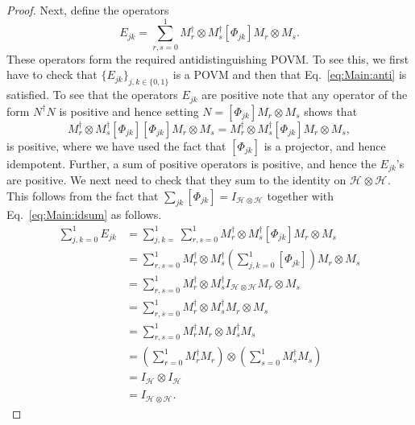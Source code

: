 \documentclass[DIV=calc,paper=a4,fontsize=11pt,twocolumn]{scrartcl} %
\theoremstyle{definition}
\theoremstyle{plain}
\newcommand{\Proj}[1]{\ensuremath{\left [ #1 \right ]}}
\newcommand{\Hilb}[1][]{\ensuremath{\mathcal{H}_{#1}}}
\begin{document}
\begin{proof}
Next, define the operators
\begin{equation}
E_{jk} = \sum_{r,s = 0}^1 M_r^{\dagger} \otimes M_s^{\dagger}
\Proj{\Phi_{jk}} M_r \otimes M_s.
\end{equation}
These operators form the required antidistinguishing POVM\@.  To see
this, we first have to check that $\{E_{jk}\}_{j,k \in \{0,1\}}$ is
a POVM and then that Eq.~\eqref{eq:Main:anti} is satisfied.  To see
that the operators $E_{jk}$ are positive note that any operator of
the form $N^{\dagger}N$ is positive and hence setting $N =
\Proj{\Phi_{jk}} M_r \otimes M_s$ shows that
\begin{equation}
M_r^{\dagger} \otimes M_s^{\dagger} \Proj{\Phi_{jk}} \Proj{\Phi_{jk}}
M_r \otimes M_s = M_r^{\dagger} \otimes M_s^{\dagger}
\Proj{\Phi_{jk}} M_r \otimes M_s,
\end{equation}
is positive, where we have used the fact that $\Proj{\Phi_{jk}}$ is
a projector, and hence idempotent.  Further, a sum of positive
operators is positive, and hence the $E_{jk}$'s are positive.  We
next need to check that they sum to the identity on $\Hilb \otimes
\Hilb$.  This follows from the fact that $\sum_{jk} \Proj{\Phi_{jk}}
= I_{\Hilb \otimes \Hilb}$ together with Eq.~\eqref{eq:Main:idsum}
as follows.
\begin{align}
\sum_{j,k = 0}^1 E_{jk} & = \sum_{j,k=}^1 \sum_{r,s = 0}^1
M_r^{\dagger} \otimes
M_s^{\dagger} \Proj{\Phi_{jk}} M_r \otimes M_s \\
& = \sum_{r,s = 0}^1 M_r^{\dagger} \otimes M_s^{\dagger} \left (
\sum_{j,k=0}^1\Proj{\Phi_{jk}}\right ) M_r
\otimes M_s \\
& = \sum_{r,s = 0}^1 M_r^{\dagger} \otimes M_s^{\dagger} I_{\Hilb
\otimes \Hilb} M_r \otimes M_s \\
& = \sum_{r,s = 0}^1 M_r^{\dagger} \otimes M_s^{\dagger} M_r
\otimes M_s \\
& = \sum_{r,s = 0}^1 M_r^{\dagger}M_r \otimes M_s^{\dagger} M_s \\
& = \left ( \sum_{r=0}^1 M_r^{\dagger}M_r \right ) \otimes \left
( \sum_{s=0}^1 M_s^{\dagger}M_s \right ) \\
& = I_{\Hilb} \otimes I_{\Hilb} \\
& = I_{\Hilb \otimes \Hilb}.
\end{align}


\end{proof}
\end{document}
